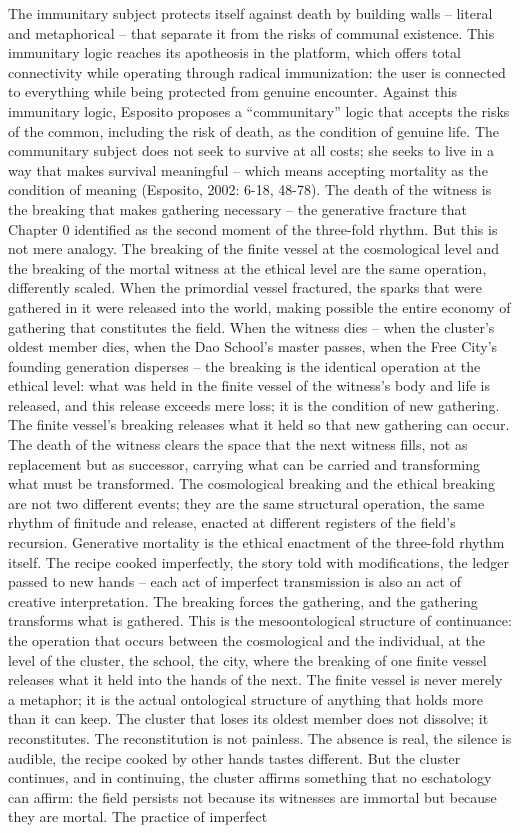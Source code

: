 The immunitary subject protects itself against death by building walls – literal and metaphorical – that separate it from the risks of communal existence. This immunitary logic reaches its apotheosis in the platform, which offers total connectivity while operating through radical immunization: the user is connected to everything while being protected from genuine encounter. Against this immunitary logic, Esposito proposes a “communitary” logic that accepts the risks of the common, including the risk of death, as the condition of genuine life. The communitary subject does not seek to survive at all costs; she seeks to live in a way that makes survival meaningful – which means accepting mortality as the condition of meaning (Esposito, 2002: 6-18, 48-78). The death of the witness is the breaking that makes gathering necessary – the generative fracture that Chapter 0 identified as the second moment of the three-fold rhythm. But this is not mere analogy. The breaking of the finite vessel at the cosmological level and the breaking of the mortal witness at the ethical level are the same operation, differently scaled. When the primordial vessel fractured, the sparks that were gathered in it were released into the world, making possible the entire economy of gathering that constitutes the field. When the witness dies – when the cluster’s oldest member dies, when the Dao School’s master passes, when the Free City’s founding generation disperses – the breaking is the identical operation at the ethical level: what was held in the finite vessel of the witness’s body and life is released, and this release exceeds mere loss; it is the condition of new gathering. The finite vessel’s breaking releases what it held so that new gathering can occur. The death of the witness clears the space that the next witness fills, not as replacement but as successor, carrying what can be carried and transforming what must be transformed. The cosmological breaking and the ethical breaking are not two different events; they are the same structural operation, the same rhythm of finitude and release, enacted at different registers of the field’s recursion. Generative mortality is the ethical enactment of the three-fold rhythm itself. The recipe cooked imperfectly, the story told with modifications, the ledger passed to new hands – each act of imperfect transmission is also an act of creative interpretation. The breaking forces the gathering, and the gathering transforms what is gathered. This is the mesoontological structure of continuance: the operation that occurs between the cosmological and the individual, at the level of the cluster, the school, the city, where the breaking of one finite vessel releases what it held into the hands of the next. The finite vessel is never merely a metaphor; it is the actual ontological structure of anything that holds more than it can keep. The cluster that loses its oldest member does not dissolve; it reconstitutes. The reconstitution is not painless. The absence is real, the silence is audible, the recipe cooked by other hands tastes different. But the cluster continues, and in continuing, the cluster affirms something that no eschatology can affirm: the field persists not because its witnesses are immortal but because they are mortal. The practice of imperfect 